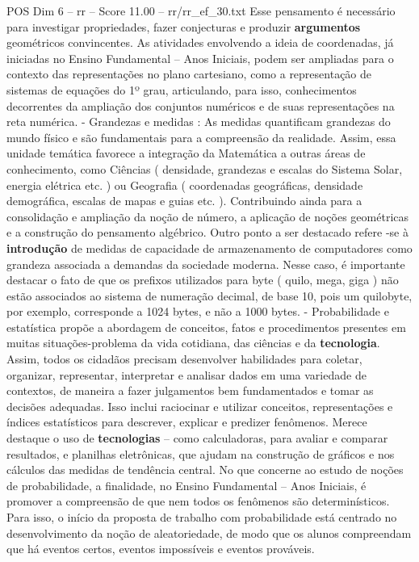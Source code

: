 \begin{textsample}{POS Dim 6 – rr – Score 11.00 – rr/rr\_ef\_30.txt}
Esse pensamento é necessário para investigar propriedades, fazer conjecturas e produzir \textbf{argumentos} geométricos convincentes.
As atividades envolvendo a ideia de coordenadas, já iniciadas no Ensino Fundamental – Anos Iniciais, podem ser ampliadas para o contexto das representações no plano cartesiano, como a representação de sistemas de equações do 1º grau, articulando, para isso, conhecimentos decorrentes da ampliação dos conjuntos numéricos e de suas representações na reta numérica. - Grandezas e medidas : As medidas quantificam grandezas do mundo físico e são fundamentais para a compreensão da realidade.
Assim, essa unidade temática favorece a integração da Matemática a outras áreas de conhecimento, como Ciências ( densidade, grandezas e escalas do Sistema Solar, energia elétrica etc. ) ou Geografia ( coordenadas geográficas, densidade demográfica, escalas de mapas e guias etc. ).
Contribuindo ainda para a consolidação e ampliação da noção de número, a aplicação de noções geométricas e a construção do pensamento algébrico.
Outro ponto a ser destacado refere -se à \textbf{introdução} de medidas de capacidade de armazenamento de computadores como grandeza associada a demandas da sociedade moderna.
Nesse caso, é importante destacar o fato de que os prefixos utilizados para byte ( quilo, mega, giga ) não estão associados ao sistema de numeração decimal, de base 10, pois um quilobyte, por exemplo, corresponde a 1024 bytes, e não a 1000 bytes. - Probabilidade e estatística propõe a abordagem de conceitos, fatos e procedimentos presentes em muitas situações-problema da vida cotidiana, das ciências e da \textbf{tecnologia}.
Assim, todos os cidadãos precisam desenvolver habilidades para coletar, organizar, representar, interpretar e analisar dados em uma variedade de contextos, de maneira a fazer julgamentos bem fundamentados e tomar as decisões adequadas.
Isso inclui raciocinar e utilizar conceitos, representações e índices estatísticos para descrever, explicar e predizer fenômenos.
Merece destaque o uso de \textbf{tecnologias} – como calculadoras, para avaliar e comparar resultados, e planilhas eletrônicas, que ajudam na construção de gráficos e nos cálculos das medidas de tendência central.
No que concerne ao estudo de noções de probabilidade, a finalidade, no Ensino Fundamental – Anos Iniciais, é promover a compreensão de que nem todos os fenômenos são determinísticos.
Para isso, o início da proposta de trabalho com probabilidade está centrado no desenvolvimento da noção de aleatoriedade, de modo que os alunos compreendam que há eventos certos, eventos impossíveis e eventos prováveis.

\end{textsample}
